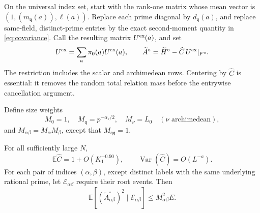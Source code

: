 On the universal index set, start with the rank-one matrix whose mean
vector is
\((1,(m_{\mathfrak q}(a)),\boldsymbol\ell(a))\).
Replace each prime diagonal by \(d_{\mathfrak q}(a)\), and replace
same-field, distinct-prime entries by the exact second-moment quantity
in \eqref{eq:covariance}.  Call the resulting matrix
\(U^{\rm ex}(a)\), and set
\[
 U^{\rm ex}=\sum_a\pi_0(a)U^{\rm ex}(a),\qquad
 \widetilde A^\circ=
       \widetilde H^\circ-\widehat C\,U^{\rm ex}|_{F^\circ}.
\]
The restriction includes the scalar and archimedean rows.  Centering
by \(\widehat C\) is essential: it removes the random total relation
mass before the entrywise cancellation argument.

Define size weights
\[
 M_0=1,\quad M_{\mathfrak q}=p^{-\alpha_s/2},\quad
 M_\nu=L_0\quad(\nu\text{ archimedean}),
\]
and \(M_{\alpha\beta}=M_\alpha M_\beta\), except that
\(M_{\mathfrak q\mathfrak q}=1\).

\begin{proposition}\label{prop:moments}
For all sufficiently large \(N\),
\[
 \mathbb E\widehat C=1+O(K_1^{-0.90}),\qquad
 \operatorname{Var}(\widehat C)=O(L^{-a}).
\]
For each pair of indices \((\alpha,\beta)\), except distinct labels
with the same underlying rational prime, let
\(\mathcal E_{\alpha\beta}\) require their root events.  Then
\begin{equation}\label{eq:centered-moment}
 \mathbb E\left[(\widetilde A^\circ_{\alpha\beta})^2
             \mid\mathcal E_{\alpha\beta}\right]
 \le M_{\alpha\beta}^2E.
\end{equation}
\end{proposition}

